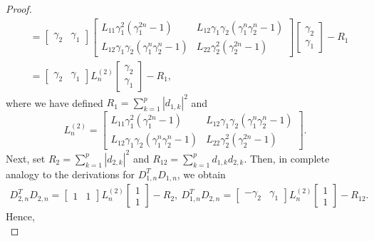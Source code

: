 \documentclass[12pt]{article}
\begin{document}
\begin{proof}
\begin{equation}
\begin{aligned}
&=\begin{bmatrix}\gamma_2&\gamma_1\end{bmatrix} 
\begin{bmatrix}
L_{11}\gamma_1^2(\gamma_1^{2n}-1) &L_{12}\gamma_1\gamma_2(\gamma_1^n\gamma_2^n-1)\\[2pt]L_{12}\gamma_1\gamma_2(\gamma_1^n\gamma_2^n-1) &L_{22}\gamma_2^2(\gamma_2^{2n}-1)
\end{bmatrix}
\begin{bmatrix}\gamma_2\\[2pt]\gamma_1\end{bmatrix}-R_1\\[2pt]
&=\begin{bmatrix}\gamma_2&\gamma_1\end{bmatrix}L_{n}^{(2)}\begin{bmatrix}\gamma_2\\[2pt]\gamma_1\end{bmatrix}-R_1,
\end{aligned}
\end{equation}
where we have defined $R_1=\sum_{k=1}^p |d_{1,k}|^2$ and
$$
L_{n}^{(2)}=\begin{bmatrix}
L_{11}\gamma_1^2(\gamma_1^{2n}-1) &L_{12}\gamma_1\gamma_2(\gamma_1^n\gamma_2^n-1)\\[2pt]L_{12}\gamma_1\gamma_2(\gamma_1^n\gamma_2^n-1) &L_{22}\gamma_2^2(\gamma_2^{2n}-1)
\end{bmatrix}.
$$
Next, set $R_2 = \sum_{k=1}^p |d_{2,k}|^2$ and $R_{12} = \sum_{k=1}^p d_{1,k} d_{2,k}$. Then, in complete analogy to the derivations for $D^T_{1,n}D_{1,n}$, we obtain
\begin{equation}\label{2norm-D2n}
\begin{aligned}
D_{2,n}^TD_{2,n}=\begin{bmatrix}1&1\end{bmatrix} L_n^{(2)}\begin{bmatrix}1\\[2pt]1\end{bmatrix}-R_2,~
D_{1,n}^TD_{2,n}=\begin{bmatrix}-\gamma_2&\gamma_1\end{bmatrix} L_n^{(2)}\begin{bmatrix}1\\[2pt]1\end{bmatrix}-R_{12}.
\end{aligned}
\end{equation}
Hence, 
\begin{equation}\label{diff-D12n}

\end{equation}
\end{proof}
\end{document}
